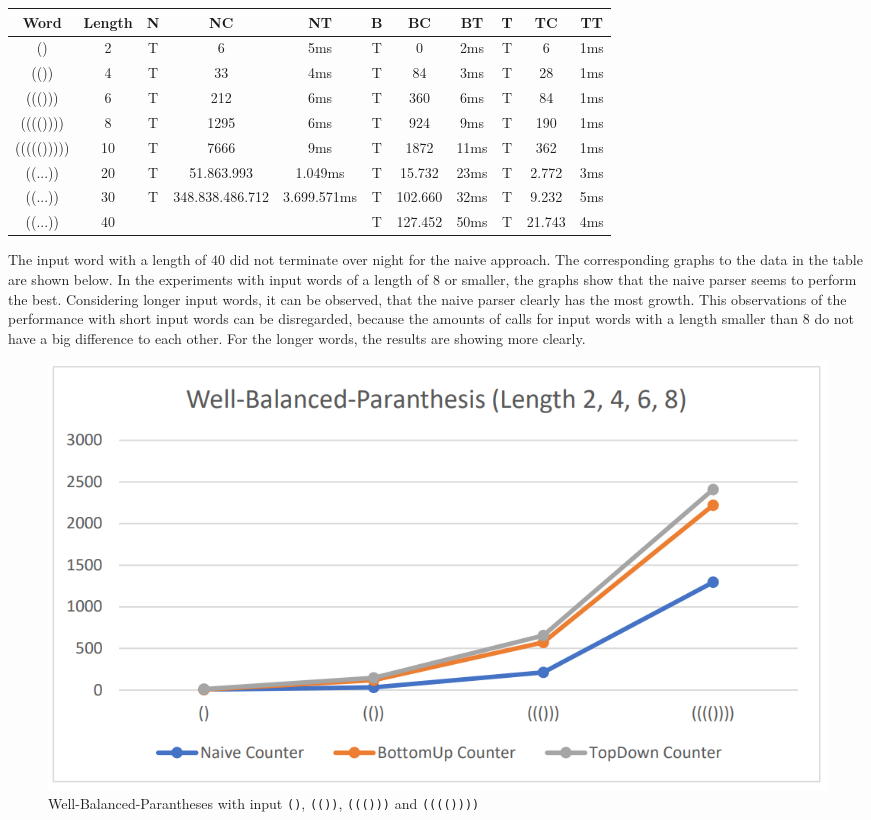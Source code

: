 \documentclass[a4paper, 11pt]{article}
\begin{document}
\begin{small}
\begin{tabular}{|c|c||c|c|c||c|c|c||c|c|c|}
\hline
Word & Length & N & NC & NT & B & BC & BT & T & TC & TT \\
\hline
\hline
() & 2 & T & 6 & 5ms & T & 0 & 2ms & T & 6 & 1ms \\
\hline
(()) & 4 & T & 33 & 4ms & T & 84 & 3ms & T & 28 & 1ms \\
\hline
((())) & 6 & T & 212 & 6ms & T & 360 & 6ms & T & 84 & 1ms \\
\hline
(((()))) & 8 & T & 1295 & 6ms & T & 924 & 9ms & T & 190 & 1ms \\
\hline
((((())))) & 10 & T & 7666 & 9ms & T & 1872 & 11ms & T & 362 & 1ms \\
\hline
((...)) & 20 & T & 51.863.993 & 1.049ms & T & 15.732 & 23ms & T & 2.772 & 3ms \\
\hline
((...)) & 30 & T & 348.838.486.712 & 3.699.571ms & T & 102.660 & 32ms & T & 9.232 & 5ms \\
\hline
((...)) & 40 & & & & T & 127.452 & 50ms & T & 21.743 & 4ms \\
\hline
\end{tabular}
\end{small}

The input word with a length of $40$ did not terminate over night for the naive approach. The corresponding graphs to the data in the table are shown below. In the experiments with input words of a length of $8$ or smaller, the graphs show that the naive parser seems to perform the best. Considering longer input words, it can be observed, that the naive parser clearly has the most growth. This observations of the performance with short input words can be disregarded, because the amounts of calls for input words with a length smaller than $8$ do not have a big difference to each other. For the longer words, the results are showing more clearly.
\\
\begin{figure}[H]
\begin{center}
\includegraphics[scale=0.4]{diagrams/WBP_1.png}
\end{center}
\caption{Well-Balanced-Parantheses with input \texttt{()}, \texttt{(())}, \texttt{((()))} and \texttt{(((())))}}
\end{figure}
\end{document}
